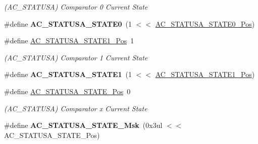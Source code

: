 \begin{DoxyCompactItemize}
\begin{DoxyCompactList}\small\item\em (A\+C\+\_\+\+S\+T\+A\+T\+U\+S\+A) Comparator 0 Current State \end{DoxyCompactList}\item 
\hypertarget{group___s_a_m_l21___a_c_ga0dc118c4e91a1b7265e26d879c499f0c}{}\#define {\bfseries A\+C\+\_\+\+S\+T\+A\+T\+U\+S\+A\+\_\+\+S\+T\+A\+T\+E0}~(1 $<$$<$ \hyperlink{group___s_a_m_l21___a_c_gae23aae3cd17aca60cfa3046da6f432c0}{A\+C\+\_\+\+S\+T\+A\+T\+U\+S\+A\+\_\+\+S\+T\+A\+T\+E0\+\_\+\+Pos})\label{group___s_a_m_l21___a_c_ga0dc118c4e91a1b7265e26d879c499f0c}

\item 
\hypertarget{group___s_a_m_l21___a_c_gaa15668b5c57b09a6b65cab3c19bef8e5}{}\#define \hyperlink{group___s_a_m_l21___a_c_gaa15668b5c57b09a6b65cab3c19bef8e5}{A\+C\+\_\+\+S\+T\+A\+T\+U\+S\+A\+\_\+\+S\+T\+A\+T\+E1\+\_\+\+Pos}~1\label{group___s_a_m_l21___a_c_gaa15668b5c57b09a6b65cab3c19bef8e5}

\begin{DoxyCompactList}\small\item\em (A\+C\+\_\+\+S\+T\+A\+T\+U\+S\+A) Comparator 1 Current State \end{DoxyCompactList}\item 
\hypertarget{group___s_a_m_l21___a_c_ga99d33e2e9937779780a10eb722fdbf25}{}\#define {\bfseries A\+C\+\_\+\+S\+T\+A\+T\+U\+S\+A\+\_\+\+S\+T\+A\+T\+E1}~(1 $<$$<$ \hyperlink{group___s_a_m_l21___a_c_gaa15668b5c57b09a6b65cab3c19bef8e5}{A\+C\+\_\+\+S\+T\+A\+T\+U\+S\+A\+\_\+\+S\+T\+A\+T\+E1\+\_\+\+Pos})\label{group___s_a_m_l21___a_c_ga99d33e2e9937779780a10eb722fdbf25}

\item 
\hypertarget{group___s_a_m_l21___a_c_gac205365550f29571c942656a16ca58f6}{}\#define \hyperlink{group___s_a_m_l21___a_c_gac205365550f29571c942656a16ca58f6}{A\+C\+\_\+\+S\+T\+A\+T\+U\+S\+A\+\_\+\+S\+T\+A\+T\+E\+\_\+\+Pos}~0\label{group___s_a_m_l21___a_c_gac205365550f29571c942656a16ca58f6}

\begin{DoxyCompactList}\small\item\em (A\+C\+\_\+\+S\+T\+A\+T\+U\+S\+A) Comparator x Current State \end{DoxyCompactList}\item 
\hypertarget{group___s_a_m_l21___a_c_ga8b7c22a0a04779b5391631cc002b4e8a}{}\#define {\bfseries A\+C\+\_\+\+S\+T\+A\+T\+U\+S\+A\+\_\+\+S\+T\+A\+T\+E\+\_\+\+Msk}~(0x3ul $<$$<$ A\+C\+\_\+\+S\+T\+A\+T\+U\+S\+A\+\_\+\+S\+T\+A\+T\+E\+\_\+\+Pos)\label{group___s_a_m_l21___a_c_ga8b7c22a0a04779b5391631cc002b4e8a}


\end{DoxyCompactItemize}
